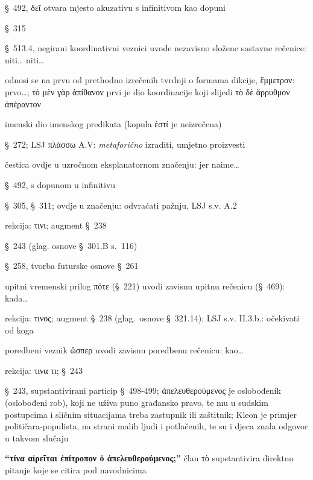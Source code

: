 \begin{description}[noitemsep]
\item[δεῖ] §~492, δεῖ otvara mjesto akuzativu s infinitivom kao dopuni
\item[εἶναι] §~315
\item[μήτε… μήτε] §~513.4, negirani koordinativni veznici uvode nezavisno složene sastavne rečenice: niti… niti…
\item[μὲν γὰρ ] odnosi se na prvu od prethodno izrečenih tvrdnji o formama dikcije, ἔμμετρον: prvo…; \textgreek[variant=ancient]{τὸ μὲν γὰρ ἀπίθανον} prvi je dio koordinacije koji slijedi \textgreek[variant=ancient]{τὸ δὲ ἄρρυθμον ἀπέραντον}
\item[ἀπίθανον] imenski dio imenskog predikata (kopula ἐστί je neizrečena)
\item[πεπλάσθαι] §~272; LSJ πλάσσω A.V: \textit{metaforično} izraditi, umjetno proizvesti
\item[γὰρ] čestica ovdje u uzročnom eksplanatornom značenju: jer naime…
\item[δοκεῖ] §~492, s dopunom u infinitivu
\item[ἐξίστησι] §~305, §~311; ovdje u značenju: odvraćati pažnju, LSJ s.v. A.2
\item[προσέχειν] rekcija: τινι; augment §~238
\item[ποιεῖ] §~243 (glag. osnove §~301.B s.~116)
\item[ἥξει] §~258, tvorba futurske osnove §~261
\item[πότε… ἥξει] upitni vremenski prilog πότε (§~221) uvodi zavisnu upitnu rečenicu (§~469): kada…
\item[προλαμβάνουσι ] rekcija: τινος; augment §~238 (glag.\ osnove §~321.14); LSJ s.v. II.3.b.: očekivati od koga
\item[ὥσπερ… προλαμβάνουσι] poredbeni veznik ὥσπερ uvodi zavisnu poredbenu rečenicu: kao\dots
\item[αἱρεῖται] rekcija: τινα τι; §~243
\item[ὁ ἀπελευθερούμενος] §~243, supstantivirani particip §~498-499; \textgreek[variant=ancient]{ἀπελευθερούμενος} je oslobođenik (oslobođeni rob), koji ne uživa puno građansko pravo, te mu u sudskim postupcima i sličnim situacijama treba zastupnik ili zaštitnik; Kleon je primjer političara-populista, na strani malih ljudi i potlačenih, te su i djeca znala odgovor u takvom slučaju
\item[τὸ] \textbf{\textgreek[variant=ancient]{``τίνα αἱρεῖται ἐπίτροπον ὁ ἀπελευθερούμενος;''}} član τὸ supstantivira direktno pitanje koje se citira pod navodnicima

\end{description}
